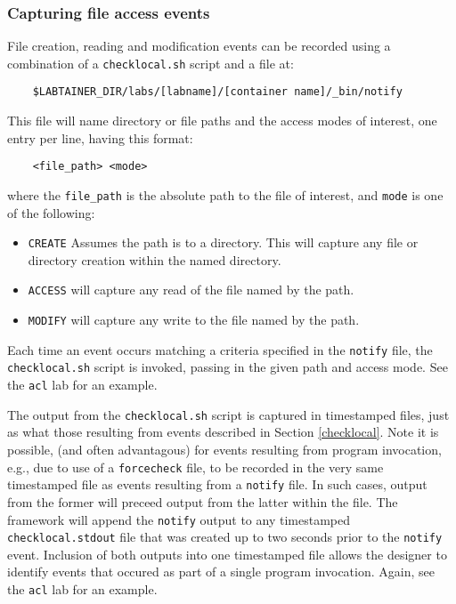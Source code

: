 \documentclass[12pt]{article}
\begin{document}
\subsubsection{Capturing file access events}
\label{notify}
File creation, reading and modification events can be recorded using a combination of
a {\tt checklocal.sh} script and a file at:
\begin{verbatim}
    $LABTAINER_DIR/labs/[labname]/[container name]/_bin/notify
\end{verbatim}
\noindent This file will name directory or file paths and the access modes of interest, one entry
per line, having this format:
\begin{verbatim}
    <file_path> <mode>
\end{verbatim}
\noindent
where the {\tt file\_path} is the absolute path to the file of interest, and {\tt mode} is 
one of the following:
\begin{itemize}
\item {\tt CREATE} Assumes the path is to a directory.  This will capture any file or directory
creation within the named directory.
\item {\tt ACCESS} will capture any read of the file named by the path.
\item {\tt MODIFY} will capture any write to the file named by the path.
\end{itemize}
\noindent Each time an event occurs matching a criteria specified in the {\tt notify} file,
the {\tt checklocal.sh} script is invoked, passing in the given path and access mode.  See
the {\tt acl} lab for an example.

The output from the {\tt checklocal.sh} script is captured in timestamped files, just as
what those resulting from events described in Section \ref{checklocal}.  Note it is possible,
(and often advantagous) for events resulting from program invocation, e.g., due to use of
a {\tt forcecheck} file, to be recorded in the very same timestamped file as events resulting
from a {\tt notify} file.  In such cases, output from the former will preceed output from the latter
within the file.  The framework will append the {\tt notify} output to any timestamped {\tt checklocal.stdout}
file that was created up to two seconds prior to the {\tt notify} event.  Inclusion of both outputs into
one timestamped file allows the designer to identify events that occured as part of a single program
invocation.  Again, see the {\tt acl} lab for an example.
\end{document}
